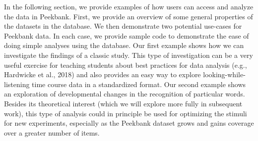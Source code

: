 \documentclass[
  english,
  man,floatsintext]{apa6}
\begin{document}
In the following section, we provide examples of how users can access and analyze the data in Peekbank.
First, we provide an overview of some general properties of the datasets in the database.
We then demonstrate two potential use-cases for Peekbank data.
In each case, we provide sample code to demonstrate the ease of doing simple analyses using the database.
Our first example shows how we can investigate the findings of a classic study.
This type of investigation can be a very useful exercise for teaching students about best practices for data analysis (e.g., Hardwicke et al., 2018) and also provides an easy way to explore looking-while-listening time course data in a standardized format.
Our second example shows an exploration of developmental changes in the recognition of particular words.
Besides its theoretical interest (which we will explore more fully in subsequent work), this type of analysis could in principle be used for optimizing the stimuli for new experiments, especially as the Peekbank dataset grows and gains coverage over a greater number of items.
\end{document}
